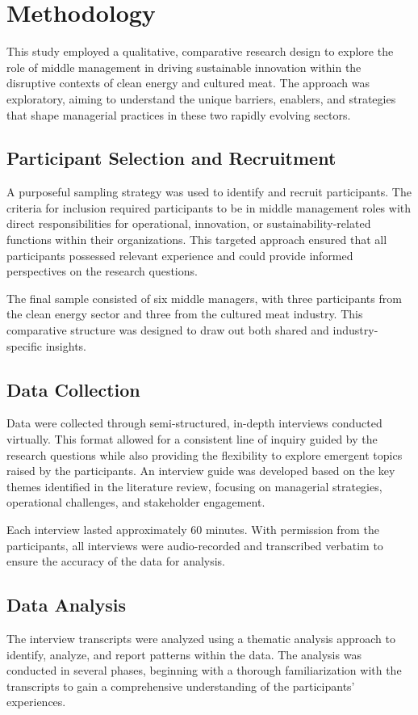 \section{Methodology}
This study employed a qualitative, comparative research design to explore the role of middle management in driving sustainable innovation within the disruptive contexts of clean energy and cultured meat. The approach was exploratory, aiming to understand the unique barriers, enablers, and strategies that shape managerial practices in these two rapidly evolving sectors.

\subsection{Participant Selection and Recruitment}
A purposeful sampling strategy was used to identify and recruit participants. The criteria for inclusion required participants to be in middle management roles with direct responsibilities for operational, innovation, or sustainability-related functions within their organizations. This targeted approach ensured that all participants possessed relevant experience and could provide informed perspectives on the research questions.

The final sample consisted of six middle managers, with three participants from the clean energy sector and three from the cultured meat industry. This comparative structure was designed to draw out both shared and industry-specific insights.

\subsection{Data Collection}
Data were collected through semi-structured, in-depth interviews conducted virtually. This format allowed for a consistent line of inquiry guided by the research questions while also providing the flexibility to explore emergent topics raised by the participants. An interview guide was developed based on the key themes identified in the literature review, focusing on managerial strategies, operational challenges, and stakeholder engagement.

Each interview lasted approximately 60 minutes. With permission from the participants, all interviews were audio-recorded and transcribed verbatim to ensure the accuracy of the data for analysis.

\subsection{Data Analysis}
The interview transcripts were analyzed using a thematic analysis approach to identify, analyze, and report patterns within the data. The analysis was conducted in several phases, beginning with a thorough familiarization with the transcripts to gain a comprehensive understanding of the participants' experiences.

